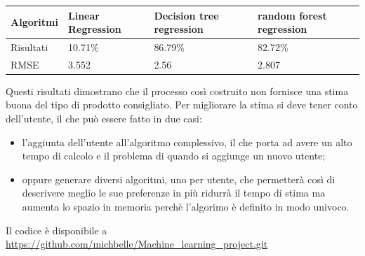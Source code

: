 \documentclass{article}
\begin{document}
\begin{tabular}{|p{}|p{}|p{}|p{}|}
\hline
Algoritmi &Linear Regression          & Decision tree regression         &random forest regression      \\
\hline
Risultati & 10.71\%           & 86.79\%    & 82.72\%          \\
\hline
RMSE &3.552 &2.56 &2.807\\
\hline
\end{tabular}

Questi risultati dimostrano che il processo così costruito non fornisce una stima buona del tipo di prodotto consigliato. Per migliorare la stima si deve tener conto dell'utente, il che può essere fatto in due casi:
\begin{itemize}
\item l'aggiunta dell'utente all'algoritmo complessivo, il che porta ad avere un alto tempo di calcolo e il problema  di quando si aggiunge un nuovo utente;
\item oppure generare diversi algoritmi, uno per utente, che permetterà così di descrivere meglio le sue preferenze in più ridurrà il tempo di stima ma aumenta lo spazio in memoria perchè l'algorimo è definito in modo univoco.
\end{itemize}
Il codice è disponibile a \url{https://github.com/michbelle/Machine_learning_project.git}
\end{document}
